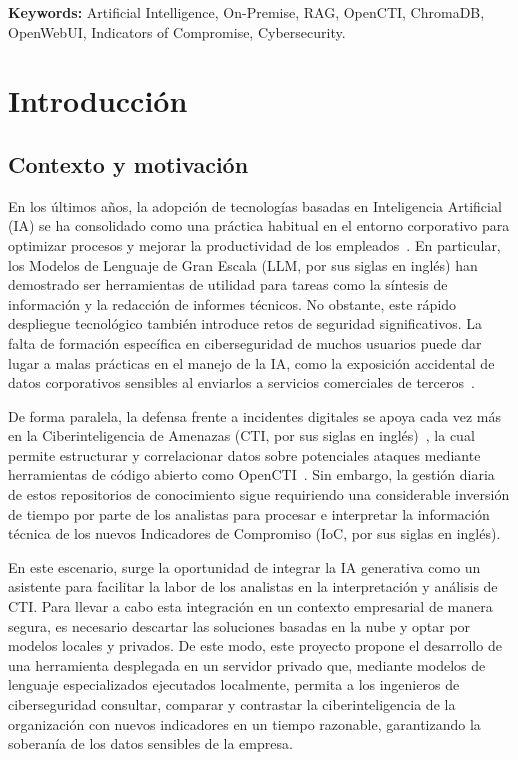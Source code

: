 \documentclass[12pt]{report}
\begin{document}
	\noindent \textbf{Keywords:} Artificial Intelligence, On-Premise, RAG, OpenCTI, ChromaDB, OpenWebUI, Indicators of Compromise, Cybersecurity.
	
\renewcommand{\tablename}{Tabla}
\renewcommand{\listtablename}{Índice de tablas}
\tableofcontents
\listoffigures
\listoftables
\newpage
{}

\chapter{Introducción}
\label{chap:introduccion}
\section{Contexto y motivación}
En los últimos años, la adopción de tecnologías basadas en Inteligencia Artificial (IA) se ha consolidado como una práctica habitual en el entorno corporativo para optimizar procesos y mejorar la productividad de los empleados~\cite{chen2025,jm3}. En particular, los Modelos de Lenguaje de Gran Escala (LLM, por sus siglas en inglés) han demostrado ser herramientas de utilidad para tareas como la síntesis de información y la redacción de informes técnicos. No obstante, este rápido despliegue tecnológico también introduce retos de seguridad significativos. La falta de formación específica en ciberseguridad de muchos usuarios puede dar lugar a malas prácticas en el manejo de la IA, como la exposición accidental de datos corporativos sensibles al enviarlos a servicios comerciales de terceros~\cite{chen2025}.

De forma paralela, la defensa frente a incidentes digitales se apoya cada vez más en la Ciberinteligencia de Amenazas (CTI, por sus siglas en inglés)~\cite{santos2025}, la cual permite estructurar y correlacionar datos sobre potenciales ataques mediante herramientas de código abierto como OpenCTI~\cite{opencti}. Sin embargo, la gestión diaria de estos repositorios de conocimiento sigue requiriendo una considerable inversión de tiempo por parte de los analistas para procesar e interpretar la información técnica de los nuevos Indicadores de Compromiso (IoC, por sus siglas en inglés).

En este escenario, surge la oportunidad de integrar la IA generativa como un asistente para facilitar la labor de los analistas en la interpretación y análisis de CTI. Para llevar a cabo esta integración en un contexto empresarial de manera segura, es necesario descartar las soluciones basadas en la nube y optar por modelos locales y privados. De este modo, este proyecto propone el desarrollo de una herramienta desplegada en un servidor privado que, mediante modelos de lenguaje especializados ejecutados localmente, permita a los ingenieros de ciberseguridad consultar, comparar y contrastar la ciberinteligencia de la organización con nuevos indicadores en un tiempo razonable, garantizando la soberanía de los datos sensibles de la empresa.
\end{document}

